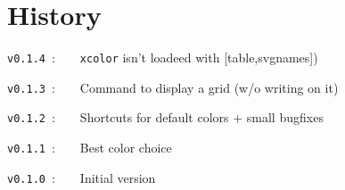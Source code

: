 \documentclass[a4paper]{article}
\begin{document}
\pagebreak

\part*{History}

\verb|v0.1.4|~:~~~~\texttt{xcolor} isn't loadeed with \textsf{[table,svgnames]})

\verb|v0.1.3|~:~~~~Command to display a grid (w/o writing on it)

\verb|v0.1.2|~:~~~~Shortcuts for default colors + small bugfixes

\verb|v0.1.1|~:~~~~Best color choice

\verb|v0.1.0|~:~~~~Initial version
\end{document}
